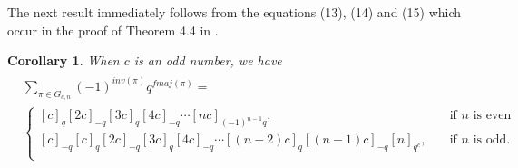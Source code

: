 \documentclass[a4paper,12pt]{article}
\newtheorem{cor}[thm]{Corollary}
\begin{document}








\vspace{0.3cm}
The next result immediately follows from the equations (13), (14) and (15) which occur in the proof of Theorem 4.4 in \cite{biagioli2012}.



\begin{cor}\label{conj1}
When $c$ is an odd number, we have
\begin{align*}
 &\sum_{\pi \in G_{c,n}} (-1)^{\widetilde{inv}(\pi)} q^{fmaj(\pi)}=\\
     &\begin{cases}
       [c]_{q}[2c]_{-q}[3c]_{q}[4c]_{-q}\cdots [nc]_{(-1)^{n-1}q},&\quad\text{if $n$ is even}\\
      [c]_{-q}[c]_{q}[2c]_{-q}[3c]_{q}[4c]_{-q}\cdots [(n-2)c]_{q}[(n-1)c]_{-q}[n]_{q^c},&\quad\text{if $n$ is odd.}\\
     \end{cases}
\end{align*}
\end{cor}
\end{document}
